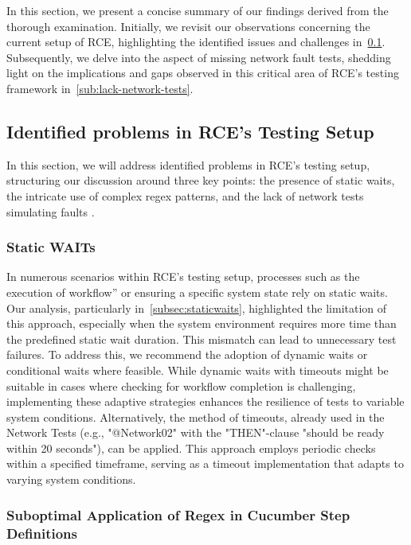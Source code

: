 In this section, we present a concise summary of our findings derived from the thorough examination. Initially, we revisit our observations concerning the current setup of RCE, highlighting the identified issues and challenges in~\cref{sub:identified-problems}. Subsequently, we delve into the aspect of missing network fault tests, shedding light on the implications and gaps observed in this critical area of RCE's testing framework in~\cref{sub:lack-network-tests}. 

\subsection{Identified problems in RCE's Testing Setup}
\label{sub:identified-problems}
In this section, we will address identified problems in RCE's testing setup, structuring our discussion around three key points: the presence of static waits, the intricate use of complex regex patterns, and the lack of network tests simulating faults
.
\subsubsection{Static WAITs}
In numerous scenarios within \ac{RCE}'s testing setup, processes such as the execution of workflow” or ensuring a specific system state rely on static waits. Our analysis, particularly in~\cref{subsec:staticwaits}, highlighted the limitation of this approach, especially when the system environment requires more time than the predefined static wait duration. This mismatch can lead to unnecessary test failures. To address this, we recommend the adoption of dynamic waits or conditional waits where feasible. While dynamic waits with timeouts might be suitable in cases where checking for workflow completion is challenging, implementing these adaptive strategies enhances the resilience of tests to variable system conditions. Alternatively, the method of timeouts, already used in the Network Tests (e.g., "@Network02" with the "THEN"-clause "should be ready within 20 seconds"), can be applied. This approach employs periodic checks within a specified timeframe, serving as a timeout implementation that adapts to varying system conditions.


\subsubsection{Suboptimal Application of Regex in Cucumber Step Definitions}
\label{subsec:resultCucumber}

